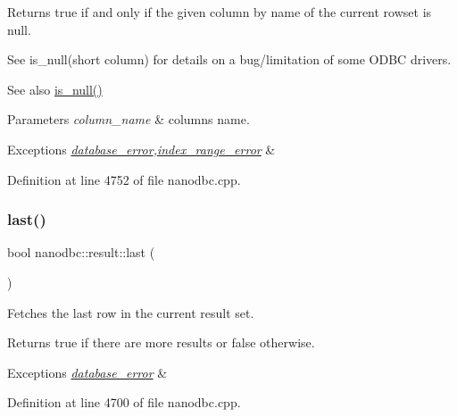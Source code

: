 Returns true if and only if the given column by name of the current rowset is null. 

See is\+\_\+null(short column) for details on a bug/limitation of some O\+D\+BC drivers. \begin{DoxySeeAlso}{See also}
\mbox{\hyperlink{classnanodbc_1_1result_a85462f6eaed91a5b03739319bd2712e7}{is\+\_\+null()}} 
\end{DoxySeeAlso}

\begin{DoxyParams}{Parameters}
{\em column\+\_\+name} & column\textquotesingle{}s name. \\
\hline
\end{DoxyParams}

\begin{DoxyExceptions}{Exceptions}
{\em \mbox{\hyperlink{classnanodbc_1_1database__error}{database\+\_\+error}},\mbox{\hyperlink{classnanodbc_1_1index__range__error}{index\+\_\+range\+\_\+error}}} & \\
\hline
\end{DoxyExceptions}


Definition at line 4752 of file nanodbc.\+cpp.

\mbox{\label{classnanodbc_1_1result_a5078a998be38e7814338597eaf100405}} 
\subsubsection{\texorpdfstring{last()}{last()}}
{\footnotesize\ttfamily bool nanodbc\+::result\+::last (\begin{DoxyParamCaption}{ }\end{DoxyParamCaption})}



Fetches the last row in the current result set. 

\begin{DoxyReturn}{Returns}
true if there are more results or false otherwise. 
\end{DoxyReturn}

\begin{DoxyExceptions}{Exceptions}
{\em \mbox{\hyperlink{classnanodbc_1_1database__error}{database\+\_\+error}}} & \\
\hline
\end{DoxyExceptions}


Definition at line 4700 of file nanodbc.\+cpp.

